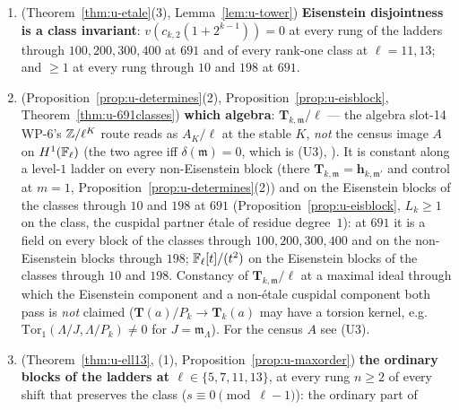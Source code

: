 \documentclass[11pt]{article}
\newcommand{\Iw}{\Lambda}                         %
\newcommand{\hcusp}{\mathbf{h}}                   %
\newcommand{\Tu}{\mathbf{T}}                      %
\newcommand{\Pk}[1]{P_{#1}}                       %
\begin{document}
\begin{enumerate}[label=(U\arabic*)]
  v1.14.1 sentence; \COMP, data signed off by the owner 2026-09-29); through
  $198$: $33$, $[1,1,2,2,10]$; through $100$: $17$, $[1,7]$; through $200$: $33$, $[1,15]$; through $300$: $49$, $[5,19]$; through $400$: $67$, $[6,6,21]$. At
  $\ell=2411$ through $10$: $1$, no cuspidal factor (predicted by ; confirmed at $n=2420$,  \S1--2, \texttt{hi12\_2420\_2411}; [D1] P1;
  and at $n=4830$, \texttt{hi12\_4830\_2411}, the WP-C10 report, \S1, 's v1.14.1 sentence). On level-$m$ ladders the polynomials agree modulo $\ell^{m}$.
\item \PROVED{} (Theorem~\ref{thm:u-etale}(3), Lemma~\ref{lem:u-tower}) \textbf{Eisenstein disjointness is a class invariant}: $v(c_{k,2}(1+2^{k-1}))=0$ at every rung of
  the ladders through $100,200,300,400$ at $691$ and of every rank-one class at $\ell=11,13$; and $\ge1$ at every rung through $10$ and $198$ at $691$.
\item \PROVED{} (Proposition~\ref{prop:u-determines}(2), Proposition~\ref{prop:u-eisblock}, Theorem~\ref{thm:u-691classes}) \textbf{which algebra}: $\Tu_{k,\mathfrak m}/\ell$ ---
  the algebra slot-14 WP-6's $\mathbb{Z}/\ell^{K}$ route reads as $A_K/\ell$ at the stable $K$, \emph{not} the census image $A$ on $H^{1}(\mathbb{F}_\ell)$ (the two agree iff
  $\delta(\mathfrak m)=0$, which is (U3), \CONJ). It is constant along a level-$1$ ladder on every non-Eisenstein block (there $\Tu_{k,\mathfrak m}=\hcusp_{k,\mathfrak m'}$
  and control at $m=1$, Proposition~\ref{prop:u-determines}(2)) and on the Eisenstein blocks of the classes through $10$ and $198$ at $691$ (Proposition~\ref{prop:u-eisblock},
  $L_k\ge1$ on the class, the cuspidal partner étale of residue degree~$1$): at $691$ it is a field on every block of the classes through $100,200,300,400$ and on
  the non-Eisenstein blocks through $198$; $\mathbb{F}_\ell[t]/(t^{2})$ on the Eisenstein blocks of the classes through $10$ and $198$. Constancy of $\Tu_{k,\mathfrak m}/\ell$ at a maximal
  ideal through which the Eisenstein component and a non-étale cuspidal component both pass is \emph{not} claimed ($\Tu(a)/\Pk{k}\to\Tu_k(a)$ may have a torsion
  kernel, e.g.\ $\mathrm{Tor}_1(\Iw/J,\Iw/\Pk{k})\ne0$ for $J=\mathfrak m_\Iw$). For the census $A$ see (U3).
\item \PROVED{} (Theorem~\ref{thm:u-ell13}, (1), Proposition~\ref{prop:u-maxorder}) \textbf{the ordinary blocks of the ladders at
  $\ell\in\{5,7,11,13\}$}, at every rung $n\ge2$ of every shift that preserves the class ($s\equiv0\pmod{\ell-1}$): the ordinary part of

\end{enumerate}
\end{document}
